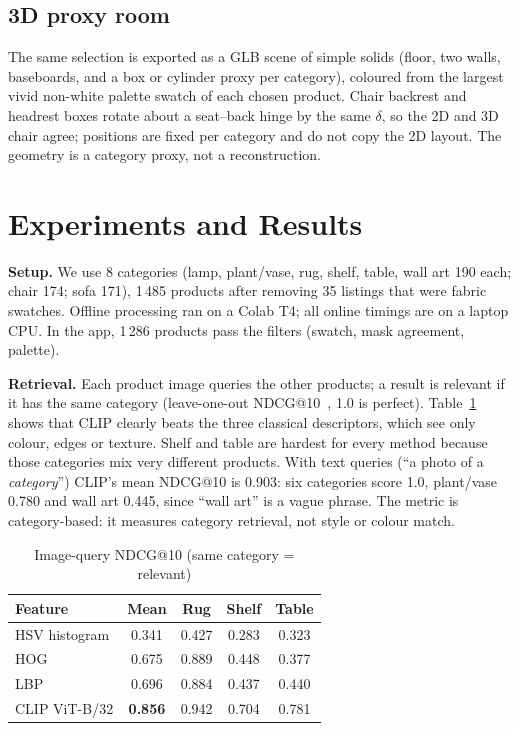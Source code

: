 \documentclass[conference]{IEEEtran}
\begin{document}
\subsection{3D proxy room}
The same selection is exported as a GLB scene of simple solids (floor, two walls, baseboards, and a box or cylinder proxy per category), coloured from the largest vivid non-white palette swatch of each chosen product. Chair backrest and headrest boxes rotate about a seat--back hinge by the same $\delta$, so the 2D and 3D chair agree; positions are fixed per category and do not copy the 2D layout. The geometry is a category proxy, not a reconstruction.

\section{Experiments and Results}
\textbf{Setup.} We use 8 categories (lamp, plant/vase, rug, shelf, table, wall art 190 each; chair 174; sofa 171), 1\,485 products after removing 35 listings that were fabric swatches. Offline processing ran on a Colab T4; all online timings are on a laptop CPU. In the app, 1\,286 products pass the filters (swatch, mask agreement, palette).

\textbf{Retrieval.} Each product image queries the other products; a result is relevant if it has the same category (leave-one-out NDCG@10~\cite{ndcg}, 1.0 is perfect). Table~\ref{tab:ndcg} shows that CLIP clearly beats the three classical descriptors, which see only colour, edges or texture. Shelf and table are hardest for every method because those categories mix very different products. With text queries (``a photo of a \textit{category}'') CLIP's mean NDCG@10 is 0.903: six categories score 1.0, plant/vase 0.780 and wall art 0.445, since ``wall art'' is a vague phrase. The metric is category-based: it measures category retrieval, not style or colour match.

\begin{table}[t]
\caption{Image-query NDCG@10 (same category = relevant)}
\label{tab:ndcg}
\centering
\small
\begin{tabular}{@{}lcccc@{}}
\toprule
Feature & Mean & Rug & Shelf & Table \\
\midrule
HSV histogram & 0.341 & 0.427 & 0.283 & 0.323 \\
HOG & 0.675 & 0.889 & 0.448 & 0.377 \\
LBP & 0.696 & 0.884 & 0.437 & 0.440 \\
CLIP ViT-B/32 & \textbf{0.856} & 0.942 & 0.704 & 0.781 \\
\bottomrule
\end{tabular}
\end{table}
\end{document}
